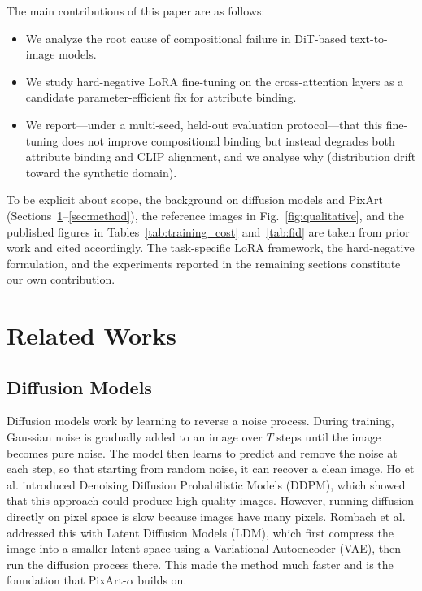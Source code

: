\documentclass[12pt,onecolumn]{IEEEtran}
\begin{document}
The main contributions of this paper are as follows:
\begin{itemize}
    \item We analyze the root cause of compositional failure in DiT-based text-to-image models.
    \item We study hard-negative LoRA fine-tuning on the cross-attention layers as a candidate parameter-efficient fix for attribute binding.
    \item We report---under a multi-seed, held-out evaluation protocol---that this fine-tuning does not improve compositional binding but instead degrades both attribute binding and CLIP alignment, and we analyse why (distribution drift toward the synthetic domain).
\end{itemize}

To be explicit about scope, the background on diffusion models and PixArt (Sections~\ref{sec:related}--\ref{sec:method}), the reference images in Fig.~\ref{fig:qualitative}, and the published figures in Tables~\ref{tab:training_cost} and~\ref{tab:fid} are taken from prior work and cited accordingly. The task-specific LoRA framework, the hard-negative formulation, and the experiments reported in the remaining sections constitute our own contribution.

\section{Related Works}\label{sec:related}

\subsection{Diffusion Models}
Diffusion models work by learning to reverse a noise process. During training, Gaussian noise is gradually added to an image over $T$ steps until the image becomes pure noise. The model then learns to predict and remove the noise at each step, so that starting from random noise, it can recover a clean image. Ho et al. \cite{ho2020ddpm} introduced Denoising Diffusion Probabilistic Models (DDPM), which showed that this approach could produce high-quality images. However, running diffusion directly on pixel space is slow because images have many pixels. Rombach et al. \cite{rombach2022latent} addressed this with Latent Diffusion Models (LDM), which first compress the image into a smaller latent space using a Variational Autoencoder (VAE), then run the diffusion process there. This made the method much faster and is the foundation that PixArt-$\alpha$ builds on.
\end{document}
